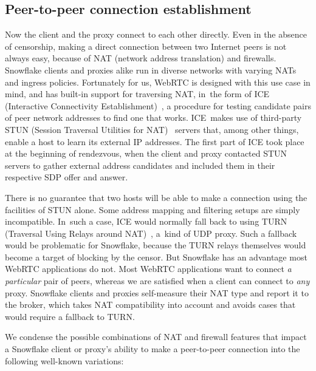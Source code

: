 \documentclass[letterpaper,twocolumn]{article}
\begin{document}
\subsection{Peer-to-peer connection establishment}
\label{sec:connection}

Now the client and the proxy connect to each other directly.
Even in the absence of censorship,
making a direct connection between two Internet peers is not always easy,
because of NAT (network address translation) and firewalls.
Snowflake clients and proxies alike run in diverse networks
with varying NATs and ingress policies.
Fortunately for us,
WebRTC is designed with this use case in mind,
and has built-in support for traversing NAT, in~the form of
ICE (Interactive Connectivity Establishment)~\cite{rfc8445},
a procedure for testing candidate pairs of peer network addresses
to find one that works.
ICE~makes use of third-party
STUN (Session Traversal Utilities for NAT)~\cite{rfc8489}
servers that, among other things,
enable a host to learn its external IP addresses.
The first part of ICE took place at the beginning of rendezvous,
when the client and proxy contacted STUN servers to gather
external address candidates and included them in their respective
SDP offer and answer.

There is no guarantee that two hosts will be able to make
a connection using the facilities of STUN alone.
Some address mapping and
filtering setups are simply incompatible.
In~such a case,
ICE would normally fall back to using
TURN (Traversal Using Relays around NAT)~\cite{rfc8656},
a~kind of UDP proxy.
Such a fallback would be problematic for Snowflake,
because the TURN relays themselves
would become a target of blocking by the censor.
But Snowflake has an advantage most WebRTC applications do not.
Most WebRTC applications want to connect \emph{a particular} pair of peers,
whereas we are satisfied when a client can connect to \emph{any} proxy.
Snowflake clients and proxies self-measure their NAT type
and report it to the broker,
which takes NAT compatibility into account
and avoids cases that would require a fallback to TURN.


We condense the possible combinations of NAT and firewall features
that impact
a Snowflake client or proxy's
ability to make a peer-to-peer connection
into the following well-known variations:
\end{document}

